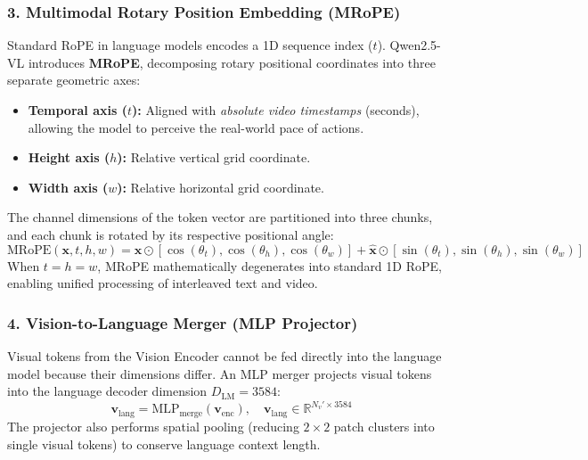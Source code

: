 \documentclass[a4paper, 11pt]{article}
\begin{document}
\subsubsection{3. Multimodal Rotary Position Embedding (MRoPE)}
Standard RoPE in language models encodes a 1D sequence index ($t$). Qwen2.5-VL introduces \textbf{MRoPE}, decomposing rotary positional coordinates into three separate geometric axes:
\begin{itemize}
    \item \textbf{Temporal axis ($t$):} Aligned with \emph{absolute video timestamps} (seconds), allowing the model to perceive the real-world pace of actions.
    \item \textbf{Height axis ($h$):} Relative vertical grid coordinate.
    \item \textbf{Width axis ($w$):} Relative horizontal grid coordinate.
\end{itemize}
The channel dimensions of the token vector are partitioned into three chunks, and each chunk is rotated by its respective positional angle:
\begin{equation}
    \text{MRoPE}(\mathbf{x}, t, h, w) = \mathbf{x} \odot \left[\cos(\theta_t), \cos(\theta_h), \cos(\theta_w)\right] + \hat{\mathbf{x}} \odot \left[\sin(\theta_t), \sin(\theta_h), \sin(\theta_w)\right]
\end{equation}
When $t = h = w$, MRoPE mathematically degenerates into standard 1D RoPE, enabling unified processing of interleaved text and video.

\subsubsection{4. Vision-to-Language Merger (MLP Projector)}
Visual tokens from the Vision Encoder cannot be fed directly into the language model because their dimensions differ. An MLP merger projects visual tokens into the language decoder dimension $D_{\text{LM}} = 3584$:
\begin{equation}
    \mathbf{v}_{\text{lang}} = \text{MLP}_{\text{merge}}(\mathbf{v}_{\text{enc}}), \quad \mathbf{v}_{\text{lang}} \in \mathbb{R}^{N_v' \times 3584}
\end{equation}
The projector also performs spatial pooling (reducing $2 \times 2$ patch clusters into single visual tokens) to conserve language context length.
\end{document}
